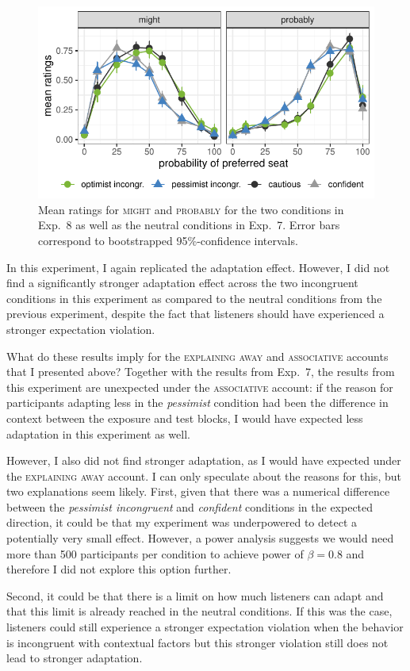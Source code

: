 \begin{figure}[t]
    \centering
    \includegraphics[width=.5\columnwidth, trim={0 0.75cm 0 0cm}]{./plots/incongruent.pdf}
    \caption{Mean ratings for \textsc{might} and \textsc{probably} for the two conditions in Exp.~8 as well as the neutral conditions in Exp.~7. Error bars correspond to bootstrapped 95\%-confidence intervals.}
    \label{fig:results-exp8}
\end{figure}

In this experiment, I again replicated the adaptation effect. However, I did not find a significantly stronger adaptation effect across the two incongruent conditions in this experiment as compared to the neutral conditions from the previous experiment, despite the fact that listeners should have experienced a stronger expectation violation.

What do these results imply for the \textsc{explaining away} and \textsc{associative} accounts that I presented above? Together with the results from Exp.~7, the results from this experiment are unexpected under the \textsc{associative} account: if the reason for participants adapting less in the \textit{pessimist} condition had been the difference in context between the exposure and test blocks, I would have expected less adaptation in this experiment as well.

However, I also did not find stronger adaptation, as I would have expected under the \textsc{explaining away} account. I can only speculate about the reasons for this, but two explanations seem likely. First, given that there was a numerical difference between the \textit{pessimist incongruent} and \textit{confident} conditions in the expected direction, it could be that my experiment was underpowered to detect a potentially very small effect. However, a power analysis suggests we would need more than 500 participants per condition to achieve power of $\beta=0.8$ and therefore I did not explore this option further.

Second, it could be that there is a limit on how much listeners can adapt and that this limit is already reached in the neutral conditions. If this was the case, listeners could still experience a stronger expectation violation when the behavior is incongruent with contextual factors but this stronger violation still does not lead to stronger adaptation. 

